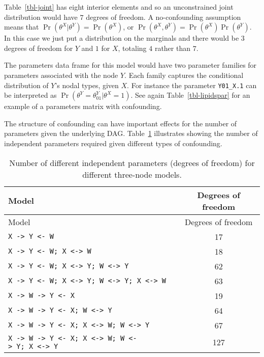 \documentclass[
  11pt,
  article]{jss}
\begin{document}
Table~\ref{tbl-joint} has eight interior elements and so an
unconstrained joint distribution would have \(7\) degrees of freedom. A
no-confounding assumption means that
\(\Pr(\theta^X | \theta^Y) = \Pr(\theta^X)\), or
\(\Pr(\theta^X, \theta^Y) = \Pr(\theta^X)\Pr(\theta^Y)\). In this case
we just put a distribution on the marginals and there would be \(3\)
degrees of freedom for \(Y\) and \(1\) for \(X\), totaling \(4\) rather
than \(7\).

The parameters data frame for this model would have two parameter
families for parameters associated with the node \(Y\). Each family
captures the conditional distribution of \(Y\)'s nodal types, given
\(X\). For instance the parameter \texttt{Y01\_X.1} can be interpreted
as \(\Pr(\theta^Y = \theta^Y_{01} | \theta^X=1)\). See again
Table~\ref{tbl-lipidspar} for an example of a parameters matrix with
confounding.

The structure of confounding can have important effects for the number
of parameters given the underlying DAG. Table~\ref{tbl-dof} illustrates
showing the number of independent parameters required given different
types of confounding.

\hypertarget{tbl-dof}{}
\begin{longtable}[]{@{}lc@{}}
\caption{\label{tbl-dof}Number of different independent parameters
(degrees of freedom) for different three-node models.}\tabularnewline
\toprule\noalign{}
Model & Degrees of freedom \\
\midrule\noalign{}
\endfirsthead
\toprule\noalign{}
Model & Degrees of freedom \\
\midrule\noalign{}
\endhead
\bottomrule\noalign{}
\endlastfoot
\texttt{X\ -\textgreater{}\ Y\ \textless{}-\ W} & 17 \\
\texttt{X\ -\textgreater{}\ Y\ \textless{}-\ W;\ X\ \textless{}-\textgreater{}\ W}
& 18 \\
\texttt{X\ -\textgreater{}\ Y\ \textless{}-\ W;\ X\ \textless{}-\textgreater{}\ Y;\ W\ \textless{}-\textgreater{}\ Y}
& 62 \\
\texttt{X\ -\textgreater{}\ Y\ \textless{}-\ W;\ X\ \textless{}-\textgreater{}\ Y;\ W\ \textless{}-\textgreater{}\ Y;\ X\ \textless{}-\textgreater{}\ W}
& 63 \\
\texttt{X\ -\textgreater{}\ W\ -\textgreater{}\ Y\ \textless{}-\ X} &
19 \\
\texttt{X\ -\textgreater{}\ W\ -\textgreater{}\ Y\ \textless{}-\ X;\ W\ \textless{}-\textgreater{}\ Y}
& 64 \\
\texttt{X\ -\textgreater{}\ W\ -\textgreater{}\ Y\ \textless{}-\ X;\ X\ \textless{}-\textgreater{}\ W;\ W\ \textless{}-\textgreater{}\ Y}
& 67 \\
\texttt{X\ -\textgreater{}\ W\ -\textgreater{}\ Y\ \textless{}-\ X;\ X\ \textless{}-\textgreater{}\ W;\ W\ \textless{}-\textgreater{}\ Y;\ X\ \textless{}-\textgreater{}\ Y}
& 127 \\
\end{longtable}
\end{document}
